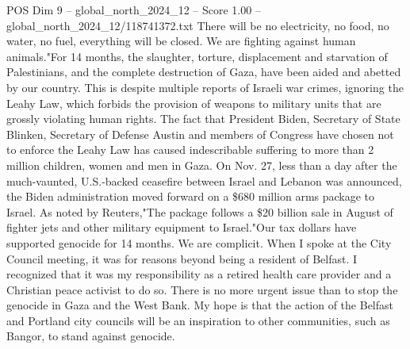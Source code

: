 \begin{textsample}{POS Dim 9 – global\_north\_2024\_12 – Score 1.00 – global\_north\_2024\_12/118741372.txt}
There will be no electricity, no food, no water, no fuel, everything will be closed.
We are fighting against human animals."For 14 months, the slaughter, torture, displacement and starvation of Palestinians, and the complete destruction of Gaza, have been aided and abetted by our country.
This is despite multiple reports of Israeli war crimes, ignoring the Leahy Law, which forbids the provision of weapons to military units that are grossly violating human rights.
The fact that President Biden, Secretary of State Blinken, Secretary of Defense Austin and members of Congress have chosen not to enforce the Leahy Law has caused indescribable suffering to more than 2 million children, women and men in Gaza.
On Nov. 27, less than a day after the much-vaunted, U.S.-backed ceasefire between Israel and Lebanon was announced, the Biden administration moved forward on a \$680 million arms package to Israel.
As noted by Reuters,"The package follows a \$20 billion sale in August of fighter jets and other military equipment to Israel."Our tax dollars have supported genocide for 14 months.
We are complicit.
When I spoke at the City Council meeting, it was for reasons beyond being a resident of Belfast.
I recognized that it was my responsibility as a retired health care provider and a Christian peace activist to do so.
There is no more urgent issue than to stop the genocide in Gaza and the West Bank.
My hope is that the action of the Belfast and Portland city councils will be an inspiration to other communities, such as Bangor, to stand against genocide.

\end{textsample}
